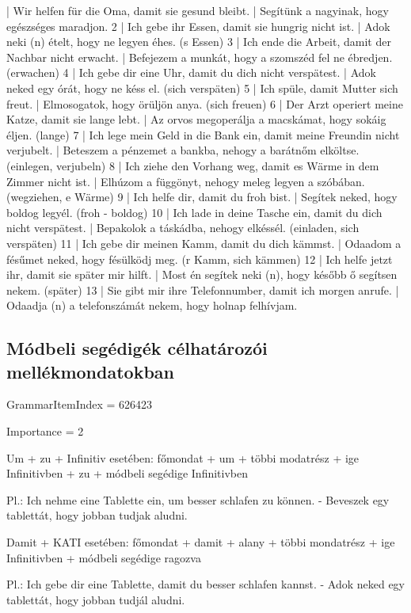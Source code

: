 \documentclass{article}
\newenvironment{desc}{\verbatim}{\endverbatim}
\newenvironment{exmp}{\verbatim}{\endverbatim}
\begin{document}
\begin{exmp}
1 | Wir helfen für die Oma, damit sie gesund bleibt. | Segítünk a nagyinak, hogy egészséges maradjon.
2 | Ich gebe ihr Essen, damit sie hungrig nicht ist. | Adok neki (n) ételt, hogy ne legyen éhes. (s Essen)
3 | Ich ende die Arbeit, damit der Nachbar nicht erwacht. | Befejezem a munkát, hogy a szomszéd fel ne ébredjen. (erwachen)
4 | Ich gebe dir eine Uhr, damit du dich nicht verspätest. | Adok neked egy órát, hogy ne késs el. (sich verspäten)
5 | Ich spüle, damit Mutter sich freut. | Elmosogatok, hogy örüljön anya. (sich freuen)
6 | Der Arzt operiert meine Katze, damit sie lange lebt. | Az orvos megoperálja a macskámat, hogy sokáig éljen. (lange)
7 | Ich lege mein Geld in die Bank ein, damit meine Freundin nicht verjubelt. | Beteszem a pénzemet a bankba, nehogy a barátnőm elköltse. (einlegen, verjubeln)
8 | Ich ziehe den Vorhang weg, damit es Wärme in dem Zimmer nicht ist. | Elhúzom a függönyt, nehogy meleg legyen a szóbában. (wegziehen, e Wärme)
9 | Ich helfe dir, damit du froh bist. | Segítek neked, hogy boldog legyél. (froh - boldog)
10 | Ich lade in deine Tasche ein, damit du dich nicht verspätest. | Bepakolok a táskádba, nehogy elkéssél. (einladen, sich verspäten)
11 | Ich gebe dir meinen Kamm, damit du dich kämmst. | Odaadom a fésűmet neked, hogy fésülködj meg. (r Kamm, sich kämmen)
12 | Ich helfe jetzt ihr, damit sie später mir hilft. | Most én segítek neki (n), hogy később ő segítsen nekem. (später)
13 | Sie gibt mir ihre Telefonnumber, damit ich morgen anrufe. | Odaadja (n) a telefonszámát nekem, hogy holnap felhívjam.
\end{exmp}

\subsection{Módbeli segédigék célhatározói mellékmondatokban}

GrammarItemIndex = 626423

Importance = 2

\begin{desc}
Um + zu + Infinitiv esetében:
főmondat + um + többi modatrész + ige Infinitivben + zu + módbeli segédige Infinitivben

Pl.: Ich nehme eine Tablette ein, um besser schlafen zu können. - Beveszek egy tablettát, hogy jobban tudjak aludni.

Damit + KATI esetében:
főmondat + damit + alany + többi mondatrész + ige Infinitivben + módbeli segédige ragozva

Pl.: Ich gebe dir eine Tablette, damit du besser schlafen kannst. - Adok neked egy tablettát, hogy jobban tudjál aludni.
\end{desc}
\end{document}
